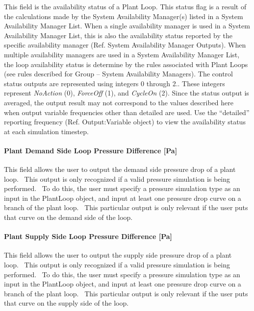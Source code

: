 This field is the availability status of a Plant Loop. This status flag is a result of the calculations made by the System Availability Manager(s) listed in a System Availability Manager List. When a single availability manager is used in a System Availability Manager List, this is also the availability status reported by the specific availability manager (Ref. System Availability Manager Outputs). When multiple availability managers are used in a System Availability Manager List, the loop availability status is determine by the rules associated with Plant Loops (see rules described for Group -- System Availability Managers). The control status outputs are represented using integers 0 through 2.. These integers represent \emph{NoAction} (0), \emph{ForceOff} (1), and \emph{CycleOn} (2). Since the status output is averaged, the output result may not correspond to the values described here when output variable frequencies other than detailed are used. Use the ``detailed'' reporting frequency (Ref. Output:Variable object) to view the availability status at each simulation timestep.

\paragraph{Plant Demand Side Loop Pressure Difference {[}Pa{]}}\label{plant-demand-side-loop-pressure-difference-pa}

This field allows the user to output the demand side pressure drop of a plant loop.~ This output is only recognized if a valid pressure simulation is being performed.~ To do this, the user must specify a pressure simulation type as an input in the PlantLoop object, and input at least one pressure drop curve on a branch of the plant loop.~ This particular output is only relevant if the user puts that curve on the demand side of the loop.

\paragraph{Plant Supply Side Loop Pressure Difference {[}Pa{]}}\label{plant-supply-side-loop-pressure-difference-pa}

This field allows the user to output the supply side pressure drop of a plant loop.~ This output is only recognized if a valid pressure simulation is being performed.~ To do this, the user must specify a pressure simulation type as an input in the PlantLoop object, and input at least one pressure drop curve on a branch of the plant loop.~ This particular output is only relevant if the user puts that curve on the supply side of the loop.


